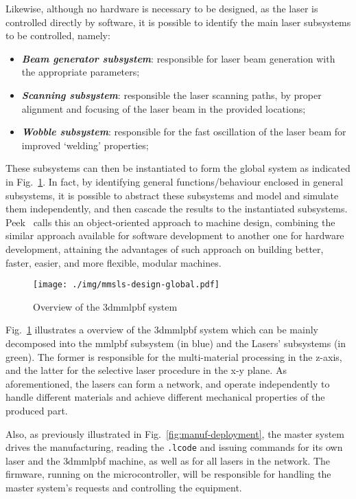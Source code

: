 Likewise, although no hardware is necessary to be designed, as the laser is
controlled directly by software, it is possible to identify the
main laser subsystems to be controlled, namely:
\begin{itemize}
\item \textbf{\emph{Beam generator subsystem}}: responsible for laser beam
  generation with the appropriate parameters;
\item \textbf{\emph{Scanning subsystem}}: responsible the laser scanning
  paths, by proper alignment and focusing of the laser beam in the provided
  locations;
\item \textbf{\emph{Wobble subsystem}}: responsible for the fast oscillation
  of the laser beam for improved `welding' properties;
\end{itemize}

These subsystems can then be instantiated to form the global system as indicated
in Fig.~\ref{fig:mmsls-global}. In fact, by identifying general
functions/behaviour enclosed in general subsystems, it is possible to abstract
these subsystems and model and simulate them independently, and then cascade the
results to the instantiated subsystems. Peek~\cite{peek2016making} calls this an
object-oriented approach to machine design, combining the similar approach
available for software development to another one for hardware development,
attaining the advantages of such approach on building better, faster, easier,
and more flexible, modular machines.

\begin{figure}[!hbt]
  \centering
    \texttt{[image: ./img/mmsls-design-global.pdf]}
  \caption{Overview of the \gls{3dmmlpbf} system}\label{fig:mmsls-global}
\end{figure}

% 

Fig.~\ref{fig:mmsls-global} illustrates a overview of the \gls{3dmmlpbf} system
which can be mainly decomposed into the \gls{mmlpbf} subsystem (in blue) and the
Lasers' subsystems (in green). The former is responsible for the multi-material processing in the
z-axis, and the latter for the selective laser procedure in the x-y plane. As
aforementioned, the lasers can form a network, and operate independently to
handle different materials and achieve different mechanical properties of the
produced part.

Also, as previously illustrated in Fig.~\ref{fig:manuf-deployment}, the master
system drives the manufacturing, reading the \texttt{.lcode} and issuing
commands for its own laser and the \gls{3dmmlpbf} machine, as well as for all
lasers in the network. The firmware, running on the microcontroller, will be
responsible for handling the master system's requests and controlling the equipment.

